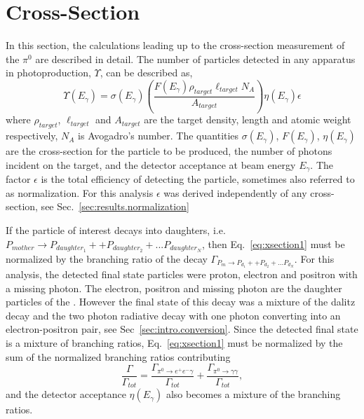 \section{Cross-Section}\label{sec:results.xsection}

In this section, the calculations leading up to the cross-section measurement of the $\pi^0$ are described in detail. The number of particles detected in any apparatus in photoproduction, $\Upsilon$, can be described as,
\begin{equation}\label{eq:xsection1}
\Upsilon(E_\gamma) = \sigma(E_\gamma) \left(\frac{F(E_\gamma) \rho_{target}\ell_{target}N_A}{A_{target}}\right)\eta(E_\gamma)\epsilon
\end{equation}
where $\rho_{target}$, $\ell_{target}$ and $A_{target}$ are the target density, length and atomic weight respectively, $N_A$ is Avogadro's number. The quantities $\sigma(E_\gamma)$, $F(E_\gamma)$, $\eta(E_\gamma)$ are the cross-section for the particle to be produced, the number of photons incident on the target, and the detector acceptance at beam energy $E_\gamma$. The factor $\epsilon$ is the total efficiency of detecting the particle, sometimes also referred to as normalization. For this analysis $\epsilon$ was derived independently of any cross-section, see Sec.~\ref{sec:results.normalization}

If the particle of interest decays into daughters, i.e. $P_{mother}\rightarrow P_{daughter_1} + +P_{daughter_2} + ...P_{daughter_N}$, then Eq.~\ref{eq:xsection1} must be normalized by the branching ratio of the decay $\Gamma_{P_{m}\rightarrow P_{d_1} + +P_{d_2} + ...P_{d_N}}$. For this analysis, the detected final state particles were proton, electron and positron with a missing photon. The electron, positron and missing photon are the daughter particles of the \piz. However the final state of this decay was a mixture of the \piz dalitz decay and the \piz two photon radiative decay with one photon converting into an electron-positron pair, see Sec~\ref{sec:intro.conversion}. Since the detected final state is a mixture of branching ratios, Eq.~\ref{eq:xsection1} must be normalized by the sum of the normalized branching ratios contributing
\begin{equation}\label{eq:xsectionBR}
 \frac{\Gamma}{\Gamma_{tot}} = \frac{\Gamma_{\pi^{0}\rightarrow e^{+}e^{-}\gamma}}{\Gamma_{tot}} + \frac{\Gamma_{\pi^{0}\rightarrow \gamma \gamma}}{\Gamma_{tot}},
\end{equation}
and the detector acceptance $\eta(E_\gamma)$ also becomes a mixture of the branching ratios.


